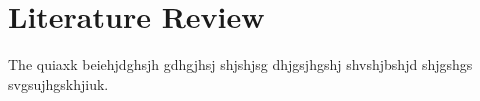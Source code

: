 \section{Literature Review}

The quiaxk beiehjdghsjh gdhgjhsj shjshjsg dhjgsjhgshj shvshjbshjd shjgshgs svgsujhgskhjiuk\cite{shannon1948}.
\\[1.1em]
\lipsum[1]
\\[1.1em]
\lipsum[1]
\\[1.1em]
\lipsum[1]
\\[1.1em]
\lipsum[1]
\\[1.1em]
\lipsum[1]
\\[1.1em]
\lipsum[1]
\\[1.1em]
\lipsum[1]
\\[1.1em]
\lipsum[1]
\\[1.1em]
\lipsum[1]
\\[1.1em]
\lipsum[1]
\\[1.1em]

